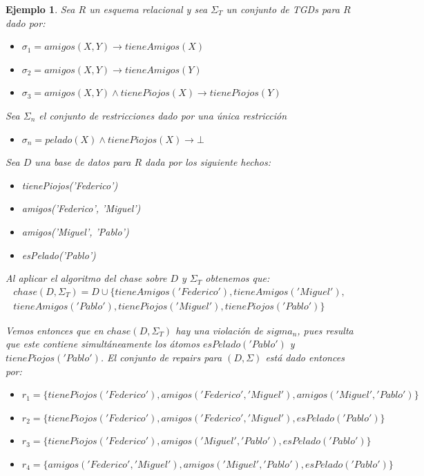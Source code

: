 \documentclass[11pt,a4paper,twoside]{tesis}
\newtheorem{exmp}{Ejemplo}
\begin{document}
\begin{exmp}\label{ejemplo_ar}
Sea $R$ un esquema relacional y sea $\Sigma_T$ un conjunto de TGDs para $R$ dado por:
    \begin{itemize}
        \item $\sigma_1 = amigos(X, Y) \rightarrow tieneAmigos(X)$
        \item $\sigma_2 = amigos(X, Y) \rightarrow tieneAmigos(Y)$
        \item $\sigma_3 = amigos(X, Y) \land tienePiojos(X) \rightarrow tienePiojos(Y)$
    \end{itemize}
Sea $\Sigma_n$ el conjunto de restricciones dado por una única restricción
    \begin{itemize}
        \item $\sigma_n = pelado(X) \land tienePiojos(X) \rightarrow \bot$
    \end{itemize}
Sea $D$ una base de datos para $R$ dada por los siguiente hechos:
    \begin{itemize}
        \item tienePiojos('Federico')
        \item amigos('Federico', 'Miguel')
        \item amigos('Miguel', 'Pablo')
        \item esPelado('Pablo')
    \end{itemize}
Al aplicar el algoritmo del \textit{chase} sobre $D$ y $\Sigma_T$ obtenemos que:
\begin{gather*}
    chase(D, \Sigma_T) = D \cup \{tieneAmigos('Federico'), tieneAmigos('Miguel'),\\ tieneAmigos('Pablo'), tienePiojos('Miguel'), tienePiojos('Pablo')\}
\end{gather*}

Vemos entonces que en $chase(D, \Sigma_T)$ hay una violación de $sigma_n$, pues resulta que este contiene simultáneamente los átomos $esPelado('Pablo')$ y $tienePiojos('Pablo')$.
El conjunto de \textit{repairs} para $(D, \Sigma)$ está dado entonces por:
    \begin{itemize}
        \item $r_1 = \{ tienePiojos('Federico'), amigos('Federico', 'Miguel'), amigos('Miguel', 'Pablo')\}$
        \item $r_2 = \{ tienePiojos('Federico'), amigos('Federico', 'Miguel'), esPelado('Pablo')\}$
        \item $r_3 = \{ tienePiojos('Federico'), amigos('Miguel', 'Pablo'), esPelado('Pablo')\}$
        \item $r_4 = \{ amigos('Federico', 'Miguel'), amigos('Miguel', 'Pablo'), esPelado('Pablo')\}$
    \end{itemize}
    

\end{exmp}
\end{document}
